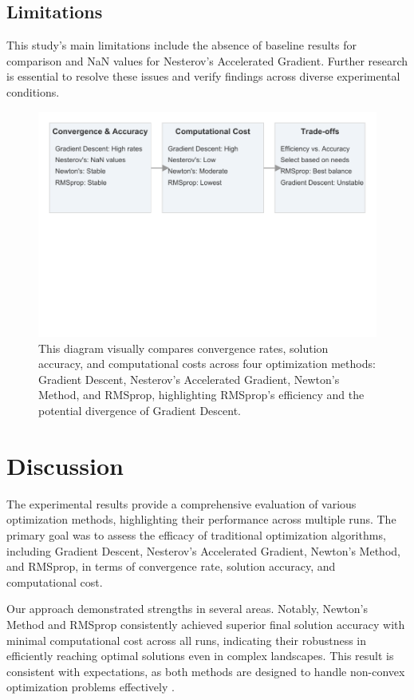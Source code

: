 \documentclass[11pt]{article}
\begin{document}
\subsection{Limitations}

This study's main limitations include the absence of baseline results for comparison and NaN values for Nesterov's Accelerated Gradient. Further research is essential to resolve these issues and verify findings across diverse experimental conditions.

 \begin{figure}[!htbp]
 \centering
 \includegraphics[width=0.9\linewidth]{diagram_results.pdf}
 \caption{This diagram visually compares convergence rates, solution accuracy, and computational costs across four optimization methods: Gradient Descent, Nesterov's Accelerated Gradient, Newton's Method, and RMSprop, highlighting RMSprop's efficiency and the potential divergence of Gradient Descent.}
 \label{fig:results}
 \end{figure}


\section{Discussion}

The experimental results provide a comprehensive evaluation of various optimization methods, highlighting their performance across multiple runs. The primary goal was to assess the efficacy of traditional optimization algorithms, including Gradient Descent, Nesterov's Accelerated Gradient, Newton's Method, and RMSprop, in terms of convergence rate, solution accuracy, and computational cost.

Our approach demonstrated strengths in several areas. Notably, Newton's Method and RMSprop consistently achieved superior final solution accuracy with minimal computational cost across all runs, indicating their robustness in efficiently reaching optimal solutions even in complex landscapes. This result is consistent with expectations, as both methods are designed to handle non-convex optimization problems effectively \cite{Luo2019AdaptiveGM}.
\end{document}
